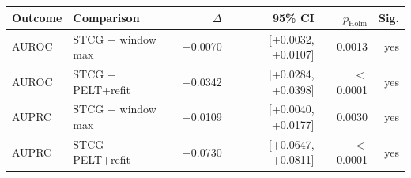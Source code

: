 \begin{tabular}{llrrrr}
\toprule
Outcome & Comparison & $\Delta$ & 95\% CI & $p_{\mathrm{Holm}}$ & Sig. \\
\midrule
AUROC & STCG $-$ window max & +0.0070 & [+0.0032, +0.0107] & 0.0013 & yes \\
AUROC & STCG $-$ PELT+refit & +0.0342 & [+0.0284, +0.0398] & $<$0.0001 & yes \\
AUPRC & STCG $-$ window max & +0.0109 & [+0.0040, +0.0177] & 0.0030 & yes \\
AUPRC & STCG $-$ PELT+refit & +0.0730 & [+0.0647, +0.0811] & $<$0.0001 & yes \\
\bottomrule
\end{tabular}
